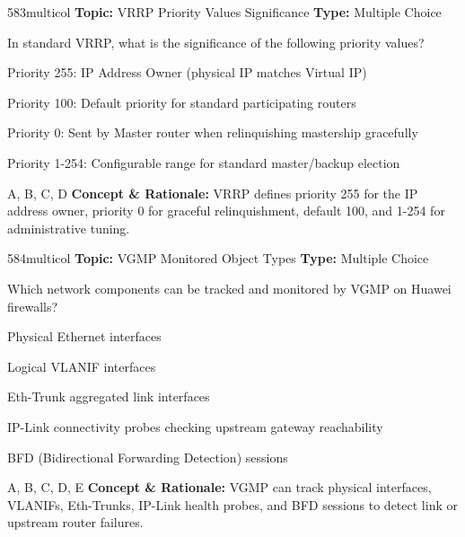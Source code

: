 \begin{qcard}{583}{multicol}
\textcolor{darkslate!75}{\small\textbf{Topic:} VRRP Priority Values Significance \hfill \textbf{Type:} Multiple Choice}\vspace{0.4em}\par
In standard VRRP, what is the significance of the following priority values?
\begin{qoptions}
\item Priority 255: IP Address Owner (physical IP matches Virtual IP)
\item Priority 100: Default priority for standard participating routers
\item Priority 0: Sent by Master router when relinquishing mastership gracefully
\item Priority 1-254: Configurable range for standard master/backup election
\end{qoptions}
\end{qcard}
\nopagebreak
\begin{explainbox}{A, B, C, D}
\textbf{Concept \& Rationale:} VRRP defines priority 255 for the IP address owner, priority 0 for graceful relinquishment, default 100, and 1-254 for administrative tuning.
\end{explainbox}

\begin{qcard}{584}{multicol}
\textcolor{darkslate!75}{\small\textbf{Topic:} VGMP Monitored Object Types \hfill \textbf{Type:} Multiple Choice}\vspace{0.4em}\par
Which network components can be tracked and monitored by VGMP on Huawei firewalls?
\begin{qoptions}
\item Physical Ethernet interfaces
\item Logical VLANIF interfaces
\item Eth-Trunk aggregated link interfaces
\item IP-Link connectivity probes checking upstream gateway reachability
\item BFD (Bidirectional Forwarding Detection) sessions
\end{qoptions}
\end{qcard}
\nopagebreak
\begin{explainbox}{A, B, C, D, E}
\textbf{Concept \& Rationale:} VGMP can track physical interfaces, VLANIFs, Eth-Trunks, IP-Link health probes, and BFD sessions to detect link or upstream router failures.
\end{explainbox}

